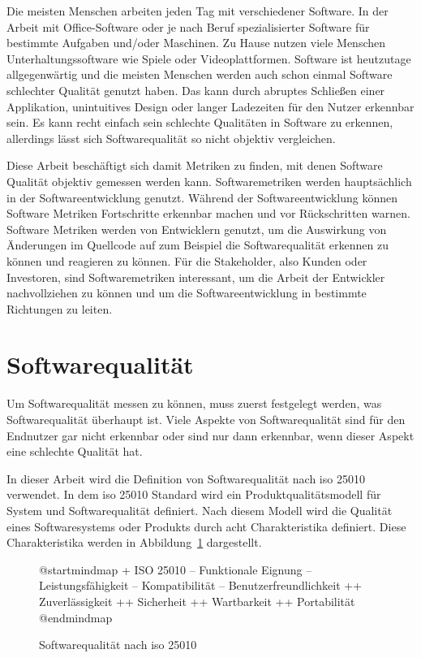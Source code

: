 \documentclass[12pt, a4paper, ngerman]{article}
\begin{document}
Die meisten Menschen arbeiten jeden Tag mit verschiedener Software.
In der Arbeit mit Office-Software oder je nach Beruf spezialisierter
Software für bestimmte Aufgaben und/oder Maschinen.
Zu Hause nutzen viele Menschen Unterhaltungssoftware wie Spiele
oder Videoplattformen.
Software ist heutzutage allgegenwärtig und die meisten Menschen
werden auch schon einmal Software schlechter Qualität genutzt haben.
Das kann durch abruptes Schließen einer Applikation,
unintuitives Design oder langer Ladezeiten
für den Nutzer erkennbar sein.
Es kann recht einfach sein
schlechte Qualitäten in Software zu erkennen,
allerdings lässt sich Softwarequalität so nicht objektiv vergleichen.

Diese Arbeit beschäftigt sich damit Metriken zu finden,
mit denen Software Qualität objektiv gemessen werden kann.
Softwaremetriken werden hauptsächlich
in der Softwareentwicklung genutzt.
Während der Softwareentwicklung können Software Metriken
Fortschritte erkennbar machen und vor Rückschritten warnen.
Software Metriken werden von Entwicklern genutzt,
um die Auswirkung von Änderungen im Quellcode auf zum Beispiel die Softwarequalität
erkennen zu können und reagieren zu können.
Für die Stakeholder, also Kunden oder Investoren,
sind Softwaremetriken interessant, 
um die Arbeit der Entwickler nachvollziehen zu können
und um die Softwareentwicklung in bestimmte Richtungen zu leiten.

\section{Softwarequalität}

Um Softwarequalität messen zu können, muss zuerst festgelegt werden,
was Softwarequalität überhaupt ist.
Viele Aspekte von Softwarequalität sind für den Endnutzer gar nicht
erkennbar oder sind nur dann erkennbar,
wenn dieser Aspekt eine schlechte Qualität hat.

In dieser Arbeit wird die Definition von Softwarequalität
nach \ac{iso} 25010~\cite{ISO25010} verwendet.
In dem \ac{iso} 25010 Standard wird ein Produktqualitätsmodell
für System und Softwarequalität definiert.
Nach diesem Modell wird die Qualität eines Softwaresystems oder Produkts
durch acht Charakteristika definiert.
Diese Charakteristika werden in Abbildung~\ref*{fig:uml:softwarequality} dargestellt.

\begin{figure}
  \centering
  \begin{plantuml}
    @startmindmap
    + ISO 25010 
    -- Funktionale Eignung
    -- Leistungsfähigkeit
    -- Kompatibilität
    -- Benutzerfreundlichkeit
    ++ Zuverlässigkeit
    ++ Sicherheit
    ++ Wartbarkeit
    ++ Portabilität
    @endmindmap
  \end{plantuml}
  \caption{Softwarequalität nach \ac{iso} 25010~\cite{ISO25010}}
  \label{fig:uml:softwarequality}
\end{figure}
\end{document}
